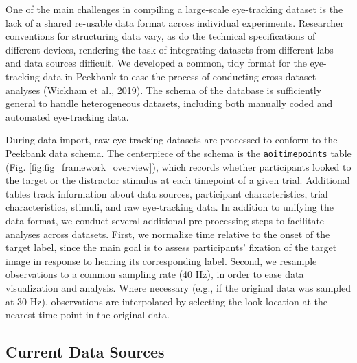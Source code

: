\documentclass[10pt, letterpaper]{article}
\begin{document}
One of the main challenges in compiling a large-scale eye-tracking
dataset is the lack of a shared re-usable data format across individual
experiments. Researcher conventions for structuring data vary, as do the
technical specifications of different devices, rendering the task of
integrating datasets from different labs and data sources difficult. We
developed a common, tidy format for the eye-tracking data in Peekbank to
ease the process of conducting cross-dataset analyses (Wickham et al.,
2019). The schema of the database is sufficiently general to handle
heterogeneous datasets, including both manually coded and automated
eye-tracking data.

During data import, raw eye-tracking datasets are processed to conform
to the Peekbank data schema. The centerpiece of the schema is the
\texttt{aoi\textunderscore timepoints} table (Fig.
\ref{fig:fig_framework_overview}), which records whether participants
looked to the target or the distractor stimulus at each timepoint of a
given trial. Additional tables track information about data sources,
participant characteristics, trial characteristics, stimuli, and raw
eye-tracking data. In addition to unifying the data format, we conduct
several additional pre-processing steps to facilitate analyses across
datasets. First, we normalize time relative to the onset of the target
label, since the main goal is to assess participants' fixation of the
target image in response to hearing its corresponding label. Second, we
resample observations to a common sampling rate (40 Hz), in order to
ease data visualization and analysis. Where necessary (e.g., if the
original data was sampled at 30 Hz), observations are interpolated by
selecting the look location at the nearest time point in the original
data.

\hypertarget{current-data-sources}{%
\subsection{Current Data Sources}\label{current-data-sources}}
\end{document}
